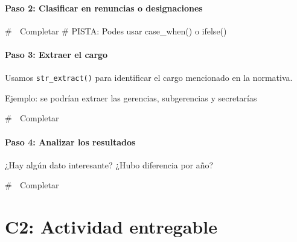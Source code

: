 \documentclass[
  letterpaper,
  DIV=11,
  numbers=noendperiod]{scrreprt}
\newenvironment{Shaded}{\begin{snugshade}}{\end{snugshade}}
\newcommand{\CommentTok}[1]{\textcolor[rgb]{0.37,0.37,0.37}{#1}}
\begin{document}
\subsubsection{\texorpdfstring{\textbf{Paso 2: Clasificar en renuncias o
designaciones}}{Paso 2: Clasificar en renuncias o designaciones}}\label{paso-2-clasificar-en-renuncias-o-designaciones}

\begin{Shaded}
\begin{Highlighting}[]
 \CommentTok{\# 📝 Completar }
 \CommentTok{\# PISTA: Podes usar case\_when() o ifelse()}
\end{Highlighting}
\end{Shaded}

\subsubsection{\texorpdfstring{\textbf{Paso 3: Extraer el
cargo}}{Paso 3: Extraer el cargo}}\label{paso-3-extraer-el-cargo}

Usamos \texttt{str\_extract()} para identificar el cargo mencionado en
la normativa.

Ejemplo: se podrían extraer las gerencias, subgerencias y secretarías

\begin{Shaded}
\begin{Highlighting}[]
\CommentTok{\# 📝 Completar}
\end{Highlighting}
\end{Shaded}

\subsubsection{\texorpdfstring{\textbf{Paso 4: Analizar los
resultados}}{Paso 4: Analizar los resultados}}\label{paso-4-analizar-los-resultados}

¿Hay algún dato interesante? ¿Hubo diferencia por año?

\begin{Shaded}
\begin{Highlighting}[]
\CommentTok{\# 📝 Completar}
\end{Highlighting}
\end{Shaded}

\subsection{}\label{section}

\chapter{C2: Actividad entregable}\label{c2-actividad-entregable}
\end{document}
